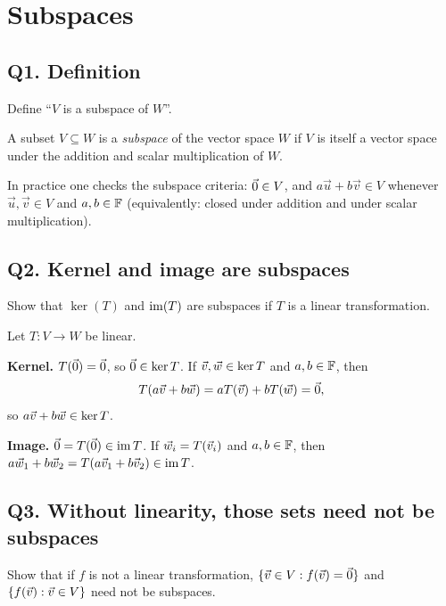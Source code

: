 \section{Subspaces}

\subsection{Q1. Definition}

\begin{promptbox}
Define ``$V$ is a subspace of $W$''.
\end{promptbox}

\begin{coursebox}
\begin{definition*}
A subset $V\subseteq W$ is a \emph{subspace} of the vector space $W$ if $V$ is
itself a vector space under the addition and scalar multiplication of $W$.
\end{definition*}
In practice one checks the subspace criteria: $\vec{0}\in V$, and
$a\vec{u}+b\vec{v}\in V$ whenever $\vec{u},\vec{v}\in V$ and $a,b\in\mathbb{F}$
(equivalently: closed under addition and under scalar multiplication).
\end{coursebox}

\subsection{Q2. Kernel and image are subspaces}

\begin{promptbox}
Show that $\ker(T)$ and $\operatorname{im}(T)$ are subspaces if $T$ is a linear transformation.
\end{promptbox}

\begin{coursebox}
Let $T:V\to W$ be linear.

\textbf{Kernel.}
$T(\vec{0})=\vec{0}$, so $\vec{0}\in\ker T$. If $\vec{v},\vec{w}\in\ker T$ and $a,b\in\mathbb{F}$, then
\[
T(a\vec{v}+b\vec{w})=aT(\vec{v})+bT(\vec{w})=\vec{0},
\]
so $a\vec{v}+b\vec{w}\in\ker T$.

\textbf{Image.}
$\vec{0}=T(\vec{0})\in\operatorname{im} T$. If $\vec{w}_i=T(\vec{v}_i)$ and $a,b\in\mathbb{F}$, then
$a\vec{w}_1+b\vec{w}_2=T(a\vec{v}_1+b\vec{v}_2)\in\operatorname{im} T$.
\end{coursebox}

\subsection{Q3. Without linearity, those sets need not be subspaces}

\begin{promptbox}
Show that if $f$ is not a linear transformation, $\{\vec{v}\in V:f(\vec{v})=\vec{0}\}$ and
$\{f(\vec{v}):\vec{v}\in V\}$ need not be subspaces.
\end{promptbox}

